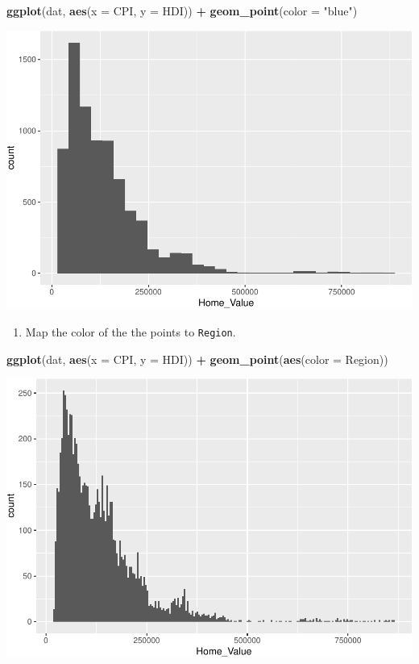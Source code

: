 \documentclass[]{book}
\newenvironment{Shaded}{\begin{snugshade}}{\end{snugshade}}
\newcommand{\DataTypeTok}[1]{\textcolor[rgb]{0.13,0.29,0.53}{#1}}
\newcommand{\KeywordTok}[1]{\textcolor[rgb]{0.13,0.29,0.53}{\textbf{#1}}}
\newcommand{\NormalTok}[1]{#1}
\newcommand{\OperatorTok}[1]{\textcolor[rgb]{0.81,0.36,0.00}{\textbf{#1}}}
\newcommand{\StringTok}[1]{\textcolor[rgb]{0.31,0.60,0.02}{#1}}
\providecommand{\tightlist}{%
  \setlength{\itemsep}{0pt}\setlength{\parskip}{0pt}}
\begin{document}
\begin{Shaded}
\begin{Highlighting}[]
\KeywordTok{ggplot}\NormalTok{(dat, }\KeywordTok{aes}\NormalTok{(}\DataTypeTok{x =}\NormalTok{ CPI, }\DataTypeTok{y =}\NormalTok{ HDI)) }\OperatorTok{+}
\StringTok{  }\KeywordTok{geom_point}\NormalTok{(}\DataTypeTok{color =} \StringTok{"blue"}\NormalTok{)}
\end{Highlighting}
\end{Shaded}

\includegraphics{R/Rgraphics/figures/unnamed-chunk-160-1.pdf}

\begin{enumerate}
\def\labelenumi{\arabic{enumi}.}
\setcounter{enumi}{2}
\tightlist
\item
  Map the color of the the points to \texttt{Region}.
\end{enumerate}

\begin{Shaded}
\begin{Highlighting}[]
\KeywordTok{ggplot}\NormalTok{(dat, }\KeywordTok{aes}\NormalTok{(}\DataTypeTok{x =}\NormalTok{ CPI, }\DataTypeTok{y =}\NormalTok{ HDI)) }\OperatorTok{+}
\StringTok{  }\KeywordTok{geom_point}\NormalTok{(}\KeywordTok{aes}\NormalTok{(}\DataTypeTok{color =}\NormalTok{ Region))}
\end{Highlighting}
\end{Shaded}

\includegraphics{R/Rgraphics/figures/unnamed-chunk-161-1.pdf}
\end{document}
